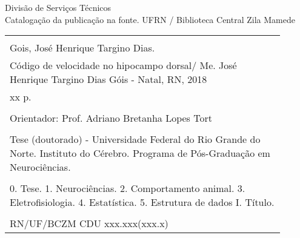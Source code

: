 %
%

\newpage

\begin{center}

\vspace*{\fill}

Divisão de Serviços Técnicos\\[1ex]
Catalogação da publicação na fonte.
UFRN / Biblioteca Central Zila Mamede

\vspace{2ex}

\begin{tabular}{|p{0.9\linewidth}|} \hline
\\
Gois, José Henrique Targino Dias.\\
\hspace{1em} Código de velocidade no hipocampo dorsal/ Me. José Henrique Targino Dias Góis - Natal, RN, 2018 \\
\hspace{1em} xx p. \\
\\
\hspace{1em} Orientador: Prof. Adriano Bretanha Lopes Tort \\
\\
\hspace{1em} Tese (doutorado) - Universidade Federal do Rio Grande do Norte.
Instituto do Cérebro. Programa de Pós-Graduação em Neurociências.\\
\\
\hspace{1em} 0. Tese. 1. Neurociências. 2. Comportamento animal. 3. Eletrofisiologia. 4. Estatística. 5. Estrutura de dados I. Título. \\
\\
RN/UF/BCZM \hfill CDU xxx.xxx(xxx.x) \\ \hline
\end{tabular} 

\end{center}
